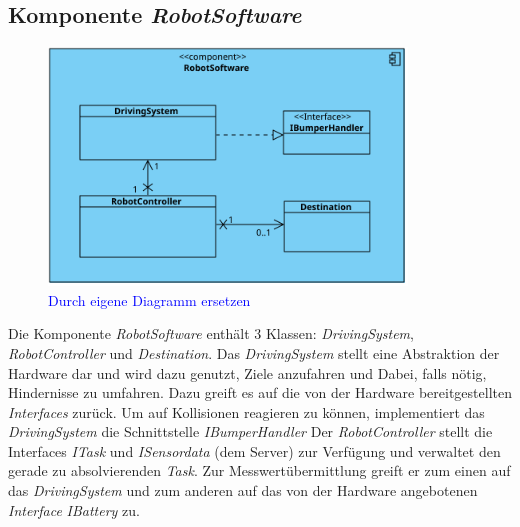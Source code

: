 \subsection{Komponente \textit{RobotSoftware}}
\begin{figure}[H]
\centering
\includegraphics[width=0.85\textwidth]{img/52.svg}
\caption{\textcolor{blue}{Durch eigene Diagramm ersetzen}}
\label{KomponentenStruktur2}
\end{figure}
Die Komponente \textit{RobotSoftware} enthält 3 Klassen: \textit{DrivingSystem}, \textit{RobotController} und \textit{Destination}. 
Das \textit{DrivingSystem} stellt eine Abstraktion der Hardware dar und wird dazu genutzt, Ziele anzufahren und Dabei, 
falls nötig, Hindernisse zu umfahren. Dazu greift es auf die von der Hardware bereitgestellten \textit{Interfaces} zurück. 
Um auf Kollisionen reagieren zu können, implementiert das \textit{DrivingSystem} die Schnittstelle \textit{IBumperHandler}
Der \textit{RobotController} stellt die Interfaces \textit{ITask} und \textit{ISensordata} (dem Server) zur Verfügung und verwaltet den gerade 
zu absolvierenden \textit{Task}. Zur Messwertübermittlung greift er zum einen auf das \textit{DrivingSystem} und zum anderen auf das 
von der Hardware angebotenen \textit{Interface} \textit{IBattery} zu.

